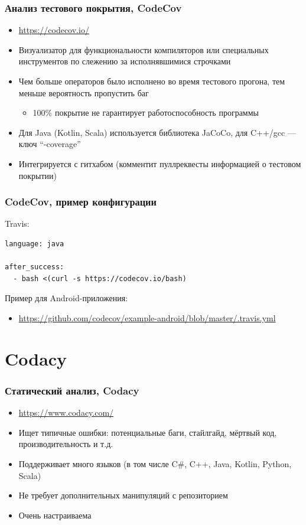\documentclass[xetex,mathserif,serif]{beamer}
\begin{document}
	\begin{frame}
		\frametitle{Анализ тестового покрытия, CodeCov}
		\begin{itemize}
			\item \url{https://codecov.io/}
			\item Визуализатор для функциональности компиляторов или специальных инструментов по слежению за исполнявшимися строчками
			\item Чем больше операторов было исполнено во время тестового прогона, тем меньше вероятность пропустить баг
			\begin{itemize}
				\item 100\% покрытие не гарантирует работоспособность программы
			\end{itemize}
			\item Для Java (Kotlin, Scala) используется библиотека JaCoCo, для C++/gcc --- ключ ``-coverage''
			\item Интегрируется с гитхабом (комментит пуллреквесты информацией о тестовом покрытии)
		\end{itemize}
	\end{frame}

	\begin{frame}[fragile]
		\frametitle{CodeCov, пример конфигурации}
		Travis:
		\begin{verbatim}
language: java

after_success:
  - bash <(curl -s https://codecov.io/bash)
		\end{verbatim}
		Пример для Android-приложения:
		\begin{footnotesize}
			\begin{itemize}
				\item \url{https://github.com/codecov/example-android/blob/master/.travis.yml}
			\end{itemize}
		\end{footnotesize}
	\end{frame}

	\section{Codacy}

	\begin{frame}
		\frametitle{Статический анализ, Codacy}
		\begin{itemize}
			\item \url{https://www.codacy.com/}
			\item Ищет типичные ошибки: потенциальные баги, стайлгайд, мёртвый код, производительность и т.д.
			\item Поддерживает много языков (в том числе C\#, C++, Java, Kotlin, Python, Scala)
			\item Не требует дополнительных манипуляций с репозиторием
			\item Очень настраиваема
		\end{itemize}
	\end{frame}
\end{document}
